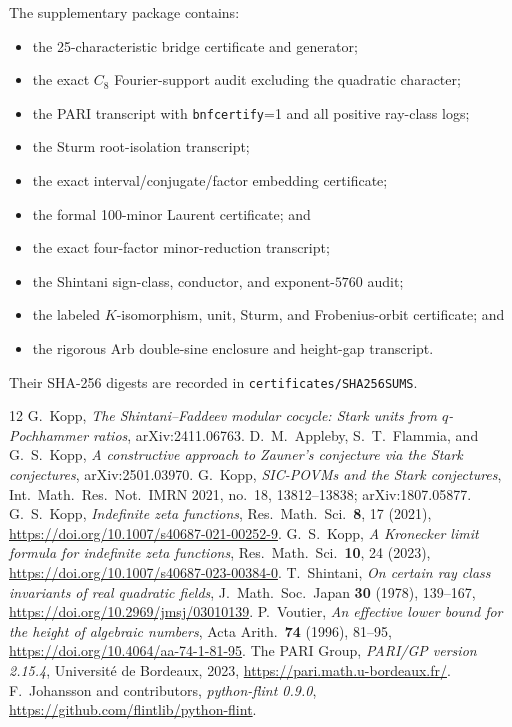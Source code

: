 \documentclass[11pt]{article}
\begin{document}
The supplementary package contains:
\begin{itemize}
\item the 25-characteristic bridge certificate and generator;
\item the exact $C_8$ Fourier-support audit excluding the quadratic
character;
\item the PARI transcript with \texttt{bnfcertify}=1 and all positive
ray-class logs;
\item the Sturm root-isolation transcript;
\item the exact interval/conjugate/factor embedding certificate;
\item the formal 100-minor Laurent certificate; and
\item the exact four-factor minor-reduction transcript;
\item the Shintani sign-class, conductor, and exponent-$5760$ audit;
\item the labeled $K$-isomorphism, unit, Sturm, and Frobenius-orbit
certificate; and
\item the rigorous Arb double-sine enclosure and height-gap transcript.
\end{itemize}
Their SHA-256 digests are recorded in
\texttt{certificates/SHA256SUMS}.

\begin{thebibliography}{12}
G.~Kopp, \emph{The Shintani--Faddeev modular cocycle: Stark units from
$q$-Pochhammer ratios}, arXiv:2411.06763.
D.~M.~Appleby, S.~T.~Flammia, and G.~S.~Kopp,
\emph{A constructive approach to Zauner's conjecture via the Stark
conjectures}, arXiv:2501.03970.
G.~Kopp, \emph{SIC-POVMs and the Stark conjectures},
Int.\ Math.\ Res.\ Not.\ IMRN 2021, no.~18, 13812--13838;
arXiv:1807.05877.
G.~S.~Kopp, \emph{Indefinite zeta functions},
Res.\ Math.\ Sci.\ \textbf{8}, 17 (2021),
\url{https://doi.org/10.1007/s40687-021-00252-9}.
G.~S.~Kopp, \emph{A Kronecker limit formula for indefinite zeta
functions}, Res.\ Math.\ Sci.\ \textbf{10}, 24 (2023),
\url{https://doi.org/10.1007/s40687-023-00384-0}.
T.~Shintani, \emph{On certain ray class invariants of real quadratic
fields}, J.\ Math.\ Soc.\ Japan \textbf{30} (1978), 139--167,
\url{https://doi.org/10.2969/jmsj/03010139}.
P.~Voutier, \emph{An effective lower bound for the height of algebraic
numbers}, Acta Arith.\ \textbf{74} (1996), 81--95,
\url{https://doi.org/10.4064/aa-74-1-81-95}.
The PARI Group, \emph{PARI/GP version 2.15.4},
Université de Bordeaux, 2023,
\url{https://pari.math.u-bordeaux.fr/}.
F.~Johansson and contributors, \emph{python-flint 0.9.0},
\url{https://github.com/flintlib/python-flint}.
\end{thebibliography}
\end{document}
